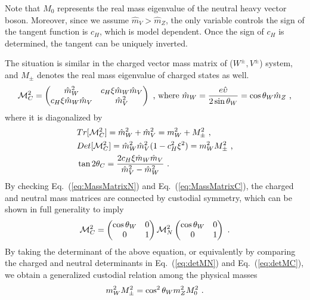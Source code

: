 Note that $M_{0}$ represents the real mass eigenvalue of the neutral heavy vector boson. Moreover, since we assume $\hat{m}_{V}>\hat{m}_{Z}$, the only variable controls the sign of the tangent function is $c_{H}$, which is model dependent. Once the sign of $c_{H}$ is determined, the tangent can be uniquely inverted.

The situation is similar in the charged vector mass matrix of ($W^{\pm},V^{\pm}$) system, and $M_{\pm}$ denotes the real mass eigenvalue of charged states as well.
\begin{align}
  \label{eq:MassMatrixC}
  \mathcal{M}_{C}^{2}=
  \begin{pmatrix}
    \hat{m}_{W}^{2} & c_{H}\xi \hat{m}_{W} \hat{m}_{V}\\
    c_{H}\xi \hat{m}_{W} \hat{m}_{V} & \hat{m}_{V}^{2}
  \end{pmatrix}
  \textup{ , where }
  \hat{m}_{W}=\frac{e\hat{\upsilon}}{2\sin{\theta_{W}}}=\cos{\theta_{W}}\hat{m}_{Z}
  \textup{ ,}
\end{align}
where it is diagonalized by
\begin{align}
  \label{eq:detMC}
  &Tr[\mathcal{M}_{C}^{2}]=\hat{m}_{W}^{2}+\hat{m}_{V}^{2}=m_{W}^{2}+M_{\pm}^{2}\textup{ ,}\nonumber\\
  &Det[\mathcal{M}_{C}^{2}]=\hat{m}_{W}^{2}\hat{m}_{V}^{2}(1-c_{H}^{2}\xi^{2})=m_{W}^{2}M_{\pm}^{2}\textup{ ,}\nonumber\\
  &\tan{2\theta_{C}}=\frac{2c_{H}\xi \hat{m}_{W} \hat{m}_{V}}{\hat{m}_{V}^{2}-\hat{m}_{W}^{2}}\textup{ .}
\end{align}
By checking Eq.~(\ref{eq:MassMatrixN}) and Eq.~(\ref{eq:MassMatrixC}), the charged and neutral mass matrices are connected by custodial symmetry, which can be shown in full generality to imply
\begin{align}
  \mathcal{M}_{C}^{2}=
  \begin{pmatrix}
    \cos{\theta_{W}} & 0\\
    0&1
  \end{pmatrix}
  \mathcal{M}_{N}^{2}
  \begin{pmatrix}
    \cos{\theta_{W}} & 0\\
    0&1
  \end{pmatrix}
  \textup{ .}
\end{align}
By taking the determinant of the above equation, or equivalently by comparing the charged and neutral determinants in Eq.~(\ref{eq:detMN}) and Eq.~(\ref{eq:detMC}), we obtain a generalized custodial relation among the physical masses
\begin{align}
  \label{eq:custRelation}
m_{W}^{2}M_{\pm}^{2}=\cos^{2}\theta_{W}m_{Z}^{2}M_{0}^{2}\textup{ .}
\end{align}
